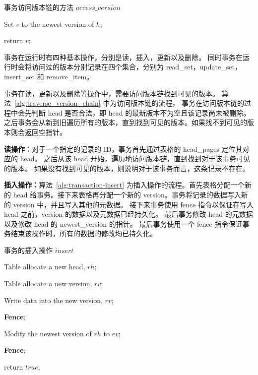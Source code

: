 \begin{algorithm}[ht]
    \caption{事务访问版本链的方法 $access\_version$}
    \label{alg:traverse_version_chain}
    \BlankLine

    Set $v$ to the newest version of $h$;


    return $v$;

\end{algorithm}

事务在运行时有四种基本操作，分别是读，插入，更新以及删除。
同时事务在运行时会将访问过的版本分别记录在四个集合，分别为 read\_set，update\_set，insert\_set 和 remove\_item。

事务在读，更新以及删除等操作中，需要访问版本链找到可见的版本。
算法~\ref{alg:traverse_version_chain} 中为访问版本链的流程。
事务在访问版本链的过程中会先判断 head 是否合法，即 head 的最新版本不为空且该记录尚未被删除。之后事务会从新到旧遍历所有的版本，直到找到可见的版本。如果找不到可见的版本则会返回空指针。


\textbf{读操作：}对于一个指定的记录的 ID，事务首先通过表格的 head\_pages 定位其对应的 head。
之后从该 head 开始，遍历地访问版本链，直到找到对于该事务可见的版本。
如果没有找到可见的版本，则说明对于该事务而言，这条记录不存在。


\textbf{插入操作：}算法~\ref{alg:transaction-insert} 为插入操作的流程。首先表格分配一个新的 head 给事务。接下来表格再分配一个新的 version。事务将记录的数据写入新的 version 中，并且写入其他的元数据。
接下来事务使用 fence 指令以保证在写入 head 之前，version 的数据以及元数据已经持久化。
最后事务修改 head 的元数据以及修改 head 的 newest\_version 的指针。
最后事务使用一个 fence 指令保证事务结束该操作时，所有的数据的修改均已持久化。

\begin{algorithm}[h]
    \caption{事务的插入操作 $insert$}
    \label{alg:transaction-insert}
    \BlankLine
    Table allocate a new head, $rh$;

    Table allocate a new version, $rv$;

    Write data into the new version, $rv$;

    \textbf{Fence};

    Modify the newest version of $rh$ to $rv$;

    \textbf{Fence};

    return $true$;

\end{algorithm}

